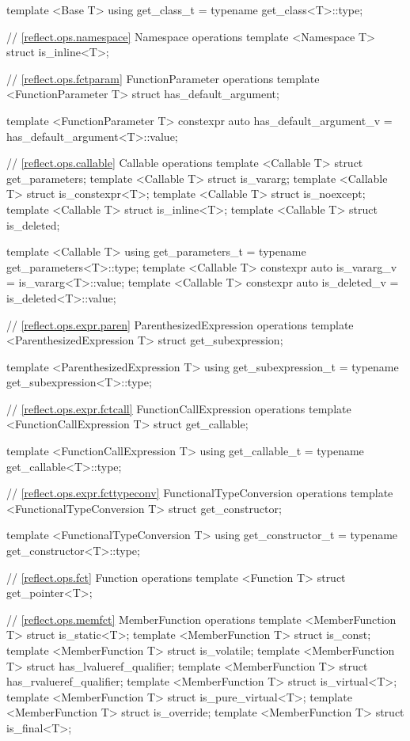 \begin{std.txt}
\begin{codeblock}
{{{{template <Base T>
  using get_class_t = typename get_class<T>::type;

// \ref{reflect.ops.namespace} Namespace operations
template <Namespace T> struct is_inline<T>;

// \ref{reflect.ops.fctparam} FunctionParameter operations
template <FunctionParameter T> struct has_default_argument;

template <FunctionParameter T>
  constexpr auto has_default_argument_v = has_default_argument<T>::value;

// \ref{reflect.ops.callable} Callable operations
template <Callable T> struct get_parameters;
template <Callable T> struct is_vararg;
template <Callable T> struct is_constexpr<T>;
template <Callable T> struct is_noexcept;
template <Callable T> struct is_inline<T>;
template <Callable T> struct is_deleted;

template <Callable T>
  using get_parameters_t = typename get_parameters<T>::type;
template <Callable T>
  constexpr auto is_vararg_v = is_vararg<T>::value;
template <Callable T>
  constexpr auto is_deleted_v = is_deleted<T>::value;

// \ref{reflect.ops.expr.paren} ParenthesizedExpression operations
template <ParenthesizedExpression T> struct get_subexpression;

template <ParenthesizedExpression T>
   using get_subexpression_t = typename get_subexpression<T>::type;

// \ref{reflect.ops.expr.fctcall} FunctionCallExpression operations
template <FunctionCallExpression T> struct get_callable;

template <FunctionCallExpression T>
  using get_callable_t = typename get_callable<T>::type;

// \ref{reflect.ops.expr.fcttypeconv} FunctionalTypeConversion operations
template <FunctionalTypeConversion T> struct get_constructor;

template <FunctionalTypeConversion T>
  using get_constructor_t = typename get_constructor<T>::type;

// \ref{reflect.ops.fct} Function operations
template <Function T> struct get_pointer<T>;

// \ref{reflect.ops.memfct} MemberFunction operations
template <MemberFunction T> struct is_static<T>;
template <MemberFunction T> struct is_const;
template <MemberFunction T> struct is_volatile;
template <MemberFunction T> struct has_lvalueref_qualifier;
template <MemberFunction T> struct has_rvalueref_qualifier;
template <MemberFunction T> struct is_virtual<T>;
template <MemberFunction T> struct is_pure_virtual<T>;
template <MemberFunction T> struct is_override;
template <MemberFunction T> struct is_final<T>;

}}}}
\end{codeblock}
\end{std.txt}
